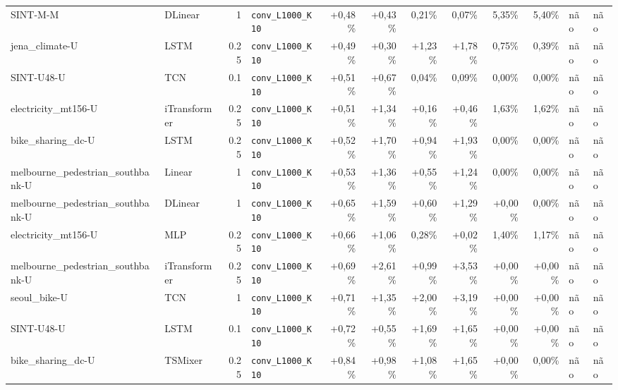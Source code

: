 \begin{longtable}{llrlrrrrrrll}
SINT-M-M & DLinear & 1 & \texttt{conv\_\allowbreak{}L1000\_\allowbreak{}K10} & +0,48\% & +0,43\% & \textminus{}0,21\% & \textminus{}0,07\% & \textminus{}5,35\% & \textminus{}5,40\% & n\~ao & n\~ao \\
jena\_climate-U & LSTM & 0.25 & \texttt{conv\_\allowbreak{}L1000\_\allowbreak{}K10} & +0,49\% & +0,30\% & +1,23\% & +1,78\% & \textminus{}0,75\% & \textminus{}0,39\% & n\~ao & n\~ao \\
SINT-U48-U & TCN & 0.1 & \texttt{conv\_\allowbreak{}L1000\_\allowbreak{}K10} & +0,51\% & +0,67\% & \textminus{}0,04\% & \textminus{}0,09\% & \textminus{}0,00\% & \textminus{}0,00\% & n\~ao & n\~ao \\
electricity\_mt156-U & iTransformer & 0.25 & \texttt{conv\_\allowbreak{}L1000\_\allowbreak{}K10} & +0,51\% & +1,34\% & +0,16\% & +0,46\% & \textminus{}1,63\% & \textminus{}1,62\% & n\~ao & n\~ao \\
bike\_sharing\_dc-U & LSTM & 0.25 & \texttt{conv\_\allowbreak{}L1000\_\allowbreak{}K10} & +0,52\% & +1,70\% & +0,94\% & +1,93\% & \textminus{}0,00\% & \textminus{}0,00\% & n\~ao & n\~ao \\
melbourne\_pedestrian\_southbank-U & Linear & 1 & \texttt{conv\_\allowbreak{}L1000\_\allowbreak{}K10} & +0,53\% & +1,36\% & +0,55\% & +1,24\% & \textminus{}0,00\% & \textminus{}0,00\% & n\~ao & n\~ao \\
melbourne\_pedestrian\_southbank-U & DLinear & 1 & \texttt{conv\_\allowbreak{}L1000\_\allowbreak{}K10} & +0,65\% & +1,59\% & +0,60\% & +1,29\% & +0,00\% & \textminus{}0,00\% & n\~ao & n\~ao \\
electricity\_mt156-U & MLP & 0.25 & \texttt{conv\_\allowbreak{}L1000\_\allowbreak{}K10} & +0,66\% & +1,06\% & \textminus{}0,28\% & +0,02\% & \textminus{}1,40\% & \textminus{}1,17\% & n\~ao & n\~ao \\
melbourne\_pedestrian\_southbank-U & iTransformer & 0.25 & \texttt{conv\_\allowbreak{}L1000\_\allowbreak{}K10} & +0,69\% & +2,61\% & +0,99\% & +3,53\% & +0,00\% & +0,00\% & n\~ao & n\~ao \\
seoul\_bike-U & TCN & 1 & \texttt{conv\_\allowbreak{}L1000\_\allowbreak{}K10} & +0,71\% & +1,35\% & +2,00\% & +3,19\% & +0,00\% & +0,00\% & n\~ao & n\~ao \\
SINT-U48-U & LSTM & 0.1 & \texttt{conv\_\allowbreak{}L1000\_\allowbreak{}K10} & +0,72\% & +0,55\% & +1,69\% & +1,65\% & +0,00\% & +0,00\% & n\~ao & n\~ao \\
bike\_sharing\_dc-U & TSMixer & 0.25 & \texttt{conv\_\allowbreak{}L1000\_\allowbreak{}K10} & +0,84\% & +0,98\% & +1,08\% & +1,65\% & +0,00\% & \textminus{}0,00\% & n\~ao & n\~ao \\

\end{longtable}
